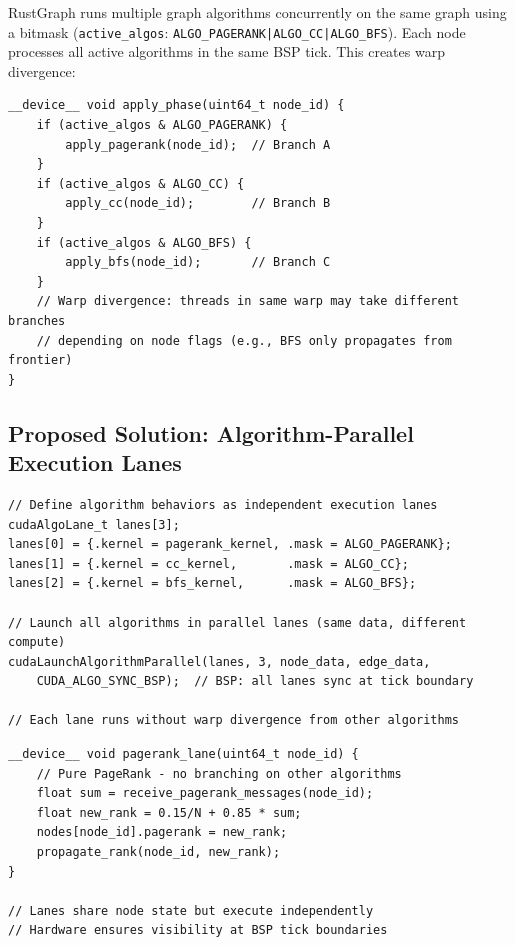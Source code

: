 \documentclass[11pt,a4paper]{article}
\begin{document}
RustGraph runs multiple graph algorithms concurrently on the same graph using a bitmask (\texttt{active\_algos}: \texttt{ALGO\_PAGERANK|ALGO\_CC|ALGO\_BFS}). Each node processes all active algorithms in the same BSP tick. This creates warp divergence:

\begin{lstlisting}[style=cstyle,title={Current: branching on algorithm bitmask}]
__device__ void apply_phase(uint64_t node_id) {
    if (active_algos & ALGO_PAGERANK) {
        apply_pagerank(node_id);  // Branch A
    }
    if (active_algos & ALGO_CC) {
        apply_cc(node_id);        // Branch B
    }
    if (active_algos & ALGO_BFS) {
        apply_bfs(node_id);       // Branch C
    }
    // Warp divergence: threads in same warp may take different branches
    // depending on node flags (e.g., BFS only propagates from frontier)
}
\end{lstlisting}

\subsection{Proposed Solution: Algorithm-Parallel Execution Lanes}

\begin{lstlisting}[style=cstyle,title={Hardware algorithm lanes}]
// Define algorithm behaviors as independent execution lanes
cudaAlgoLane_t lanes[3];
lanes[0] = {.kernel = pagerank_kernel, .mask = ALGO_PAGERANK};
lanes[1] = {.kernel = cc_kernel,       .mask = ALGO_CC};
lanes[2] = {.kernel = bfs_kernel,      .mask = ALGO_BFS};

// Launch all algorithms in parallel lanes (same data, different compute)
cudaLaunchAlgorithmParallel(lanes, 3, node_data, edge_data,
    CUDA_ALGO_SYNC_BSP);  // BSP: all lanes sync at tick boundary

// Each lane runs without warp divergence from other algorithms
\end{lstlisting}

\begin{lstlisting}[style=cstyle,title={Device-side: per-lane tick loop}]
__device__ void pagerank_lane(uint64_t node_id) {
    // Pure PageRank - no branching on other algorithms
    float sum = receive_pagerank_messages(node_id);
    float new_rank = 0.15/N + 0.85 * sum;
    nodes[node_id].pagerank = new_rank;
    propagate_rank(node_id, new_rank);
}

// Lanes share node state but execute independently
// Hardware ensures visibility at BSP tick boundaries
\end{lstlisting}
\end{document}

